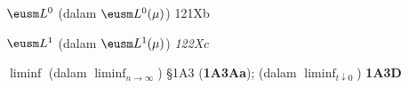 \indexmedskip
{}

























$\eusm L^0$ (dalam $\eusm L^0(\mu)$) 121Xb
















$\eusm L^1$ (dalam $\eusm L^1(\mu)$) {\it 122Xc}














































$\liminf$ (dalam $\liminf_{n\to\infty}$) \S1A3 ({\bf 1A3Aa});
  (dalam $\liminf_{t\downarrow 0}$) {\bf 1A3D}


